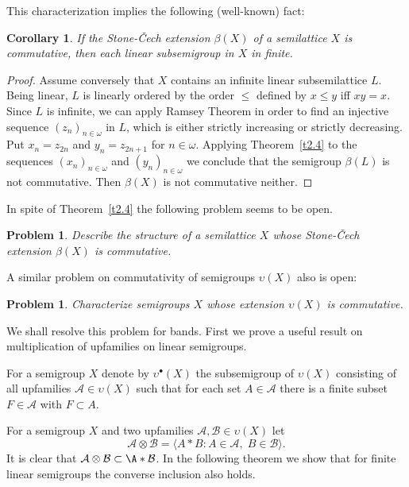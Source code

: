 \documentclass{amsart}
\newtheorem{corollary}[lem]{Corollary}
\newtheorem{problem}[lem]{Problem}
\theoremstyle{definition}
\begin{document}
This characterization implies the following (well-known) fact:

\begin{corollary}\label{c2.5} If the Stone-\v Cech extension $\beta(X)$ of a semilattice $X$ is commutative, then each linear subsemigroup in $X$ in finite.
\end{corollary}

\begin{proof} Assume conversely that $X$ contains an infinite linear subsemilattice $L$. Being linear, $L$ is linearly ordered by the order $\le$ defined by $x\le y$ iff $xy=x$. Since $L$ is infinite, we can apply Ramsey Theorem in order to find an injective sequence $(z_n)_{n\in{\omega}}$ in $L$,  which is either strictly increasing or strictly decreasing. Put $x_n=z_{2n}$ and $y_n=z_{2n+1}$ for $n\in{\omega}$. Applying Theorem~\ref{t2.4} to the sequences $(x_n)_{n\in{\omega}}$ and $(y_n)_{n\in{\omega}}$ we conclude that the semigroup $\beta(L)$ is not commutative. Then $\beta(X)$ is not commutative neither.
\end{proof}

In spite of Theorem~\ref{t2.4} the following problem seems to be open.

\begin{problem} Describe the structure of a semilattice $X$ whose Stone-\v Cech extension $\beta(X)$ is commutative.
\end{problem}

A similar problem on commutativity of semigroups ${\upsilon}(X)$ also is open:

\begin{problem} Characterize semigroups $X$ whose extension ${\upsilon}(X)$ is commutative.
\end{problem}

We shall resolve this problem for bands. First we prove a useful result on multiplication of upfamilies on linear semigroups.

For a semigroup $X$ denote by ${\upsilon^\bullet}(X)$ the subsemigroup of ${\upsilon}(X)$ consisting of all upfamilies ${\mathcal A}\in{\upsilon}(X)$ such that for each set $A\in{\mathcal A}$ there is a finite subset $F\in{\mathcal A}$ with $F\subset A$.

For a semigroup $X$ and two upfamilies ${\mathcal A},\mathcal B\in{\upsilon}(X)$ let $${\mathcal A}\otimes\mathcal B={\langle} A*B:A\in{\mathcal A},\;B\in\mathcal B{\rangle}.$$
It is clear that ${\mathcal A}\otimes\mathcal B\subset\A*\mathcal B$. In the following theorem we show that for finite linear semigroups the converse inclusion also holds.
\end{document}
